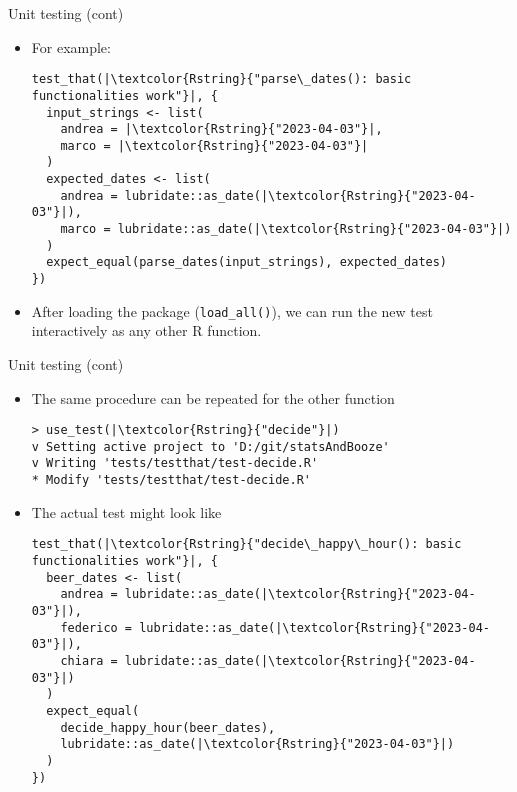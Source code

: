 \documentclass[
hyperref={bookmarks=false},
xcolor={dvipsnames,svgnames*,x11names*}, 
12pt
]{beamer}
\begin{document}
\begin{frame}[fragile]{Unit testing (cont)}
\vspace{-0.5cm}
\begin{itemize}
\itemsep 2ex
\item For example: 
\begin{lstlisting}
test_that(|\textcolor{Rstring}{"parse\_dates(): basic functionalities work"}|, {
  input_strings <- list(
    andrea = |\textcolor{Rstring}{"2023-04-03"}|,
    marco = |\textcolor{Rstring}{"2023-04-03"}|
  )
  expected_dates <- list(
    andrea = lubridate::as_date(|\textcolor{Rstring}{"2023-04-03"}|),
    marco = lubridate::as_date(|\textcolor{Rstring}{"2023-04-03"}|)
  )
  expect_equal(parse_dates(input_strings), expected_dates)
})
\end{lstlisting}
\item After loading the package (\texttt{load\_all()}), we can run the new test interactively as any other R function. 
\end{itemize}
\end{frame}

\begin{frame}[fragile]{Unit testing (cont)}
\vspace{-0.5cm}
\begin{itemize}
\itemsep 2ex
\item The same procedure can be repeated for the other function
\begin{lstlisting}
> use_test(|\textcolor{Rstring}{"decide"}|)
v Setting active project to 'D:/git/statsAndBooze'
v Writing 'tests/testthat/test-decide.R'
* Modify 'tests/testthat/test-decide.R'
\end{lstlisting}
\item The actual test might look like
\begin{lstlisting}
test_that(|\textcolor{Rstring}{"decide\_happy\_hour(): basic functionalities work"}|, {
  beer_dates <- list(
    andrea = lubridate::as_date(|\textcolor{Rstring}{"2023-04-03"}|),
    federico = lubridate::as_date(|\textcolor{Rstring}{"2023-04-03"}|),
    chiara = lubridate::as_date(|\textcolor{Rstring}{"2023-04-03"}|)
  )
  expect_equal(
    decide_happy_hour(beer_dates), 
    lubridate::as_date(|\textcolor{Rstring}{"2023-04-03"}|)
  )
})
\end{lstlisting}
\end{itemize}
\end{frame}
\end{document}

